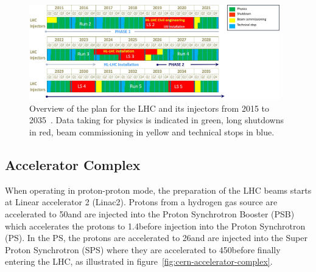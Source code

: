 \begin{figure}[htbp]
\begin{center}
\includegraphics[width=0.97\textwidth]{figs/lhc/LHC-Planning.jpg}
\caption{Overview of the plan for the LHC and its injectors from 2015 to 2035~\cite{P2TrackerTDR}. Data taking for physics is indicated in green, long shutdowns in red, beam commissioning in yellow and technical stops in blue.}
\label{fig:lhc-planning}
\end{center}
\end{figure}

\subsection{Accelerator Complex}\label{subsec:acceleratorComplex}
When operating in proton-proton mode, the preparation of the LHC beams starts at Linear accelerator 2 (Linac2). 
Protons from a hydrogen gas source are accelerated to 50\MeV and are injected into the Proton Synchrotron Booster (PSB) which accelerates the protons to 1.4\GeV before injection into the Proton Synchrotron (PS). 
In the PS, the protons are accelerated to 26\GeV and are injected into the Super Proton Synchrotron (SPS) where they are accelerated to 450\GeV before finally entering the LHC, as illustrated in figure~\ref{fig:cern-accelerator-complex}. 

